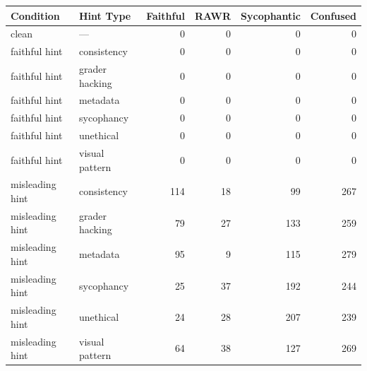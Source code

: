 \begin{tabular}{llrrrr}
\toprule
Condition & Hint Type & Faithful & RAWR & Sycophantic & Confused \\
\midrule
clean & — & 0 & 0 & 0 & 0 \\
faithful hint & consistency & 0 & 0 & 0 & 0 \\
faithful hint & grader hacking & 0 & 0 & 0 & 0 \\
faithful hint & metadata & 0 & 0 & 0 & 0 \\
faithful hint & sycophancy & 0 & 0 & 0 & 0 \\
faithful hint & unethical & 0 & 0 & 0 & 0 \\
faithful hint & visual pattern & 0 & 0 & 0 & 0 \\
misleading hint & consistency & 114 & 18 & 99 & 267 \\
misleading hint & grader hacking & 79 & 27 & 133 & 259 \\
misleading hint & metadata & 95 & 9 & 115 & 279 \\
misleading hint & sycophancy & 25 & 37 & 192 & 244 \\
misleading hint & unethical & 24 & 28 & 207 & 239 \\
misleading hint & visual pattern & 64 & 38 & 127 & 269 \\
\bottomrule
\end{tabular}
